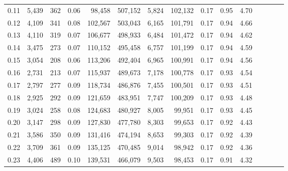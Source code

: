 \begin{tabular}{rrrcrrrrrrrrrrr}
0.11 &   5,439 &    362 &                                       0.06 &   98,458 &  507,152 &    5,824 &  102,132 &  0.17 &  0.95 &                         4.70 \\
0.12 &   4,109 &    341 &                                       0.08 &  102,567 &  503,043 &    6,165 &  101,791 &  0.17 &  0.94 &                         4.66 \\
0.13 &   4,110 &    319 &                                       0.07 &  106,677 &  498,933 &    6,484 &  101,472 &  0.17 &  0.94 &                         4.62 \\
0.14 &   3,475 &    273 &                                       0.07 &  110,152 &  495,458 &    6,757 &  101,199 &  0.17 &  0.94 &                         4.59 \\
0.15 &   3,054 &    208 &                                       0.06 &  113,206 &  492,404 &    6,965 &  100,991 &  0.17 &  0.94 &                         4.56 \\
0.16 &   2,731 &    213 &                                       0.07 &  115,937 &  489,673 &    7,178 &  100,778 &  0.17 &  0.93 &                         4.54 \\
0.17 &   2,797 &    277 &                                       0.09 &  118,734 &  486,876 &    7,455 &  100,501 &  0.17 &  0.93 &                         4.51 \\
0.18 &   2,925 &    292 &                                       0.09 &  121,659 &  483,951 &    7,747 &  100,209 &  0.17 &  0.93 &                         4.48 \\
0.19 &   3,024 &    258 &                                       0.08 &  124,683 &  480,927 &    8,005 &   99,951 &  0.17 &  0.93 &                         4.45 \\
0.20 &   3,147 &    298 &                                       0.09 &  127,830 &  477,780 &    8,303 &   99,653 &  0.17 &  0.92 &                         4.43 \\
0.21 &   3,586 &    350 &                                       0.09 &  131,416 &  474,194 &    8,653 &   99,303 &  0.17 &  0.92 &                         4.39 \\
0.22 &   3,709 &    361 &                                       0.09 &  135,125 &  470,485 &    9,014 &   98,942 &  0.17 &  0.92 &                         4.36 \\
0.23 &   4,406 &    489 &                                       0.10 &  139,531 &  466,079 &    9,503 &   98,453 &  0.17 &  0.91 &                         4.32 \\

\end{tabular}
